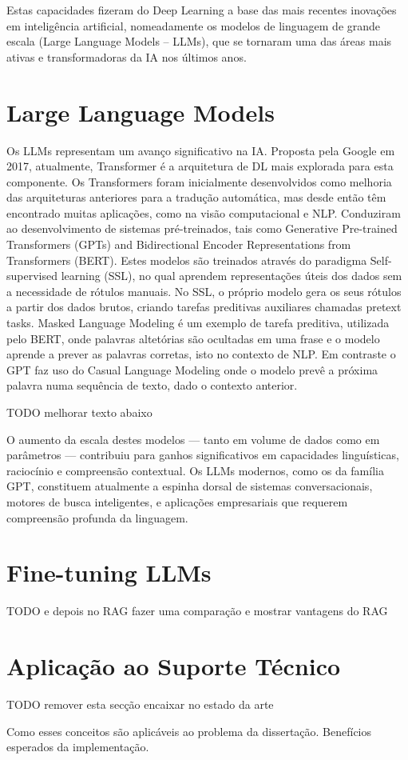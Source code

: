 Estas capacidades fizeram do Deep Learning a base das mais recentes inovações em inteligência artificial, nomeadamente os modelos de linguagem de grande escala 
(Large Language Models – LLMs), que se tornaram uma das áreas mais ativas e transformadoras da IA nos últimos anos.




\section{Large Language Models}

Os LLMs representam um avanço significativo na IA. Proposta pela Google em 2017, atualmente, Transformer é a arquitetura de DL mais explorada para esta componente. Os Transformers foram inicialmente desenvolvidos como melhoria das arquiteturas anteriores para a tradução automática, mas desde então têm encontrado muitas aplicações, como na visão computacional e NLP. Conduziram ao desenvolvimento de sistemas pré-treinados, tais como Generative Pre-trained Transformers (GPTs) and Bidirectional Encoder Representations from Transformers (BERT). Estes modelos são treinados através do paradigma Self-supervised learning (SSL), no qual aprendem representações úteis dos dados sem a necessidade de rótulos manuais. No SSL, o próprio modelo gera os seus rótulos a partir dos dados brutos, criando tarefas preditivas auxiliares chamadas pretext tasks. Masked Language Modeling é um exemplo de tarefa preditiva, utilizada pelo BERT, onde palavras altetórias são ocultadas em uma frase e o modelo aprende a prever as palavras corretas, isto no contexto de NLP. Em contraste o GPT faz uso do Casual Language Modeling onde o modelo prevê a próxima palavra numa sequência de texto, dado o contexto anterior.

TODO melhorar texto abaixo 

O aumento da escala destes modelos — tanto em volume de dados como em parâmetros — contribuiu para ganhos significativos em capacidades linguísticas, raciocínio e compreensão contextual. Os LLMs modernos, como os da família GPT, constituem atualmente a espinha dorsal de sistemas conversacionais, motores de busca inteligentes, e aplicações empresariais que requerem compreensão profunda da linguagem.

\section{Fine-tuning LLMs}

 TODO e depois no RAG fazer uma comparação e mostrar vantagens do RAG


\section{Aplicação ao Suporte Técnico}

TODO remover esta secção encaixar no estado da arte

Como esses conceitos são aplicáveis ao problema da dissertação.
Benefícios esperados da implementação.
